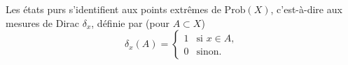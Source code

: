 Les états purs s'identifient aux points extrêmes de $\mathrm{Prob}(X)$, c'est-à-dire aux mesures de Dirac
$\delta_x$, définie par (pour $A \subset X$)
\[ \delta_x(A) =
  \begin{cases}
    1 & \text{si } x \in A,\\
    0 & \text{sinon.}
  \end{cases}
\]








